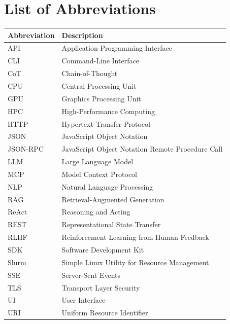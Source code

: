 \chapter*{List of Abbreviations}

\begin{longtable}{|l|p{10cm}|}
\hline
\textbf{Abbreviation} & \textbf{Description} \\
\hline
\endhead

API & Application Programming Interface \\
\hline
CLI & Command-Line Interface \\
\hline
CoT & Chain-of-Thought \\
\hline
CPU & Central Processing Unit \\
\hline
GPU & Graphics Processing Unit \\
\hline
HPC & High-Performance Computing \\
\hline
HTTP & Hypertext Transfer Protocol \\
\hline
JSON & JavaScript Object Notation \\
\hline
JSON-RPC & JavaScript Object Notation Remote Procedure Call \\
\hline
LLM & Large Language Model \\
\hline
MCP & Model Context Protocol \\
\hline
NLP & Natural Language Processing \\
\hline
RAG & Retrieval-Augmented Generation \\
\hline
ReAct & Reasoning and Acting \\
\hline
REST & Representational State Transfer \\
\hline
RLHF & Reinforcement Learning from Human Feedback \\
\hline
SDK & Software Development Kit \\
\hline
Slurm & Simple Linux Utility for Resource Management \\
\hline
SSE & Server-Sent Events \\
\hline
TLS & Transport Layer Security \\
\hline
UI & User Interface \\
\hline
URI & Uniform Resource Identifier \\
\hline

\end{longtable}

